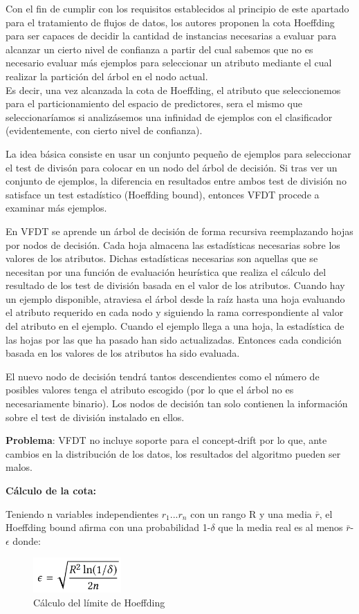 Con el fin de cumplir con los requisitos establecidos al principio de este apartado para el tratamiento de flujos de datos, los autores proponen la cota Hoeffding para ser capaces de decidir la cantidad de instancias necesarias a evaluar para alcanzar un cierto nivel de confianza a partir del cual sabemos que no es necesario evaluar más ejemplos para seleccionar un atributo mediante el cual realizar la partición del árbol en el nodo actual.\\
Es decir, una vez alcanzada la cota de Hoeffding, el atributo que seleccionemos para el particionamiento del espacio de predictores, sera el mismo que seleccionaríamos si analizásemos una infinidad de ejemplos con el clasificador (evidentemente, con cierto nivel de confianza).

La idea básica consiste en usar un conjunto pequeño de ejemplos para seleccionar el test de divisón para colocar en un nodo del árbol de decisión.
Si tras ver un conjunto de ejemplos, la diferencia en resultados entre ambos test de división no satisface un test estadístico (Hoeffding bound), entonces VFDT procede a examinar más ejemplos.

En VFDT se aprende un árbol de decisión de forma recursiva reemplazando hojas por nodos de decisión. Cada hoja almacena las estadísticas necesarias sobre los valores de los
atributos. Dichas estadísticas necesarias son aquellas que se necesitan por una función de evaluación heurística que realiza el cálculo del resultado de los test de división 
basada en el valor de los atributos.
Cuando hay un ejemplo disponible, atraviesa el árbol desde la raíz hasta una hoja evaluando el atributo requerido en cada nodo y siguiendo la rama correspondiente al valor
del atributo en el ejemplo.
Cuando el ejemplo llega a una hoja, la estadística de las hojas por las que ha pasado han sido actualizadas.
Entonces cada condición basada en los valores de los atributos ha sido evaluada.

El nuevo nodo de decisión tendrá tantos descendientes como el número de posibles valores tenga el atributo escogido (por lo que el árbol no es necesariamente binario).
Los nodos de decisión tan solo contienen la información sobre el test de división instalado en ellos.

\textbf{Problema}: VFDT no incluye soporte para el concept-drift por lo que, ante cambios en la distribución de los datos, los resultados del algoritmo pueden ser malos.

\textbf{Cálculo de la cota:}

Teniendo n variables independientes $r_{1}...r_{n}$ con un rango R y una media $\bar{r}$, el Hoeffding bound afirma con una probabilidad 1-$\delta$ que la media real es al menos $\bar{r}$-$\epsilon$ donde:
\begin{figure}[H]
	\centering
	\includegraphics[width=0.3\textwidth]{imagenes/hoeffdingbound} 
	\caption{Cálculo del límite de Hoeffding \cite{ref10}}
\end{figure}

